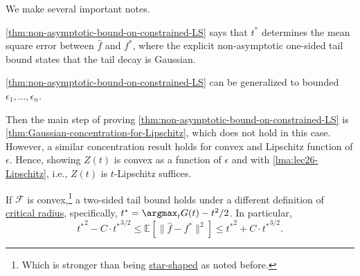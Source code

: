 We make several important notes.

\begin{note}
	\autoref{thm:non-asymptotic-bound-on-constrained-LS} says that \(t^{\ast} \) determines the mean square error between \(\hat{f} \) and \(f^{\ast} \), where the explicit non-asymptotic one-sided tail bound states that the tail decay is Gaussian.
\end{note}

\begin{note}
	\autoref{thm:non-asymptotic-bound-on-constrained-LS} can be generalized to bounded \(\epsilon _1, \dots , \epsilon _n \).
\end{note}
\begin{explanation}
	Then the main step of proving \autoref{thm:non-asymptotic-bound-on-constrained-LS} is \autoref{thm:Gaussian-concentration-for-Lipschitz}, which does not hold in this case. However, a similar concentration result holds for convex and Lipschitz function of \(\epsilon \). Hence, showing \(Z(t)\) is convex as a function of \(\epsilon \) and with \autoref{lma:lec26-Lipschitz}, i.e., \(Z(t)\) is \(t\)-Lipschitz suffices.
\end{explanation}

\begin{remark}
	If \(\mathscr{F} \) is convex,\footnote{Which is stronger than being \hyperref[def:star-shaped]{star-shaped} as noted before.} a two-sided tail bound holds under a different definition of \hyperref[def:critical-radius]{critical radius}, specifically, \(t^{\ast} = \argmax_{t} G(t) - t^2 / 2\). In particular,
	\[
		{t^{\ast} }^2 - C\cdot {t^{\ast} }^{3 / 2}
		\leq \mathbb{E}_{}\left[ \lVert \hat{f} - f^{\ast} \rVert ^2 \right]
		\leq {t^{\ast} }^2 + C\cdot {t^{\ast} }^{3 / 2}.
	\]
\end{remark}